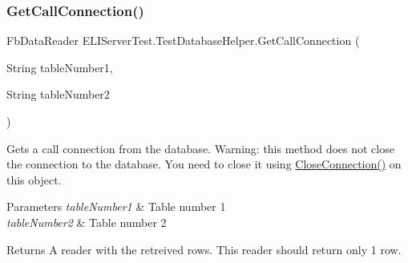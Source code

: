 \mbox{\label{class_e_l_i_server_test_1_1_test_database_helper_a1e968d24b2cf40006b6740905f408b1c}} 
\subsubsection{\texorpdfstring{Get\+Call\+Connection()}{GetCallConnection()}}
{\footnotesize\ttfamily Fb\+Data\+Reader E\+L\+I\+Server\+Test.\+Test\+Database\+Helper.\+Get\+Call\+Connection (\begin{DoxyParamCaption}\item[{String}]{table\+Number1,  }\item[{String}]{table\+Number2 }\end{DoxyParamCaption})\hspace{0.3cm}{\ttfamily [inline]}}



Gets a call connection from the database. Warning\+: this method does not close the connection to the database. You need to close it using \hyperlink{class_e_l_i_server_test_1_1_test_database_helper_ae1ec2aaa4d83ed9f63a02844ec32600e}{Close\+Connection()} on this object. 


\begin{DoxyParams}{Parameters}
{\em table\+Number1} & Table number 1\\
\hline
{\em table\+Number2} & Table number 2\\
\hline
\end{DoxyParams}
\begin{DoxyReturn}{Returns}
A reader with the retreived rows. This reader should return only 1 row.
\end{DoxyReturn}
\mbox{\label{class_e_l_i_server_test_1_1_test_database_helper_a3b612109e388d96caf2444552db9d0e3}} 
